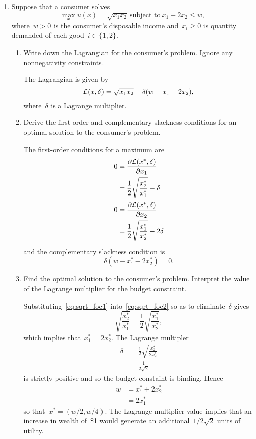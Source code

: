 
\begin{enumerate}

	\item
	Suppose that a consumer solves
	\[ \max_xu(x)=\sqrt{x_1x_2}\ \text{subject to}\ x_1+2x_2\le w, \]
	where~$w>0$ is the consumer's disposable income and~$x_i\ge0$ is quantity demanded of each good~$i\in\{1,2\}$.
	\begin{enumerate}

		\item
		Write down the Lagrangian for the consumer's problem.
		Ignore any nonnegativity constraints.
		\begin{solution}
			The Lagrangian is given by
			\[ \mathcal{L}(x,\delta)=\sqrt{x_1x_2}+\delta(w-x_1-2x_2), \]
			where~$\delta$ is a Lagrange multiplier.
		\end{solution}

		\item
		Derive the first-order and complementary slackness conditions for an optimal solution to the consumer's problem.
		\begin{solution}
			The first-order conditions for a maximum are
			\begin{align}
				0
				&= \frac{\partial\mathcal{L}(x^*,\delta)}{\partial x_1}\\
				&= \frac{1}{2}\sqrt{\frac{x_2^*}{x_1^*}}-\delta 
					\label{eq:sqrt_foc1}\\
				0
				&= \frac{\partial\mathcal{L}(x^*,\delta)}{\partial x_2}\\
				&= \frac{1}{2}\sqrt{\frac{x_1^*}{x_2^*}}-2\delta
					\label{eq:sqrt_foc2}
			\end{align}
			and the complementary slackness condition is
			\[ \delta(w-x_1^*-2x_2^*)=0. \]
		\end{solution}

		\item
		Find the optimal solution to the consumer's problem.
		Interpret the value of the Lagrange multiplier for the budget constraint.
		\begin{solution}
			Substituting~\eqref{eq:sqrt_foc1} into~\eqref{eq:sqrt_foc2} so as to eliminate~$\delta$ gives
			\[ \sqrt{\frac{x_2^*}{x_1^*}}%
				=\frac{1}{2}\sqrt{\frac{x_1^*}{x_2^*}}, \]
			which implies that~$x_1^*=2x_2^*$.
			The Lagrange multipler
			\begin{align}
				\delta
				&= \frac{1}{2}\sqrt{\frac{x_2^*}{2x_2^*}}\\
				&= \frac{1}{2\sqrt{2}}
			\end{align}
			is strictly positive and so the budget constaint is binding.
			Hence
			\begin{align}
				w
				&= x_1^*+2x_2^*\\
				&= 2x_1^*
			\end{align}
			so that~$x^*=(w/2,w/4)$.
			The Lagrange multiplier value implies that an increase in wealth of~\$1 would generate an additional~$1/2\sqrt{2}$ units of utility.
		\end{solution}


\end{enumerate}
\end{enumerate}
